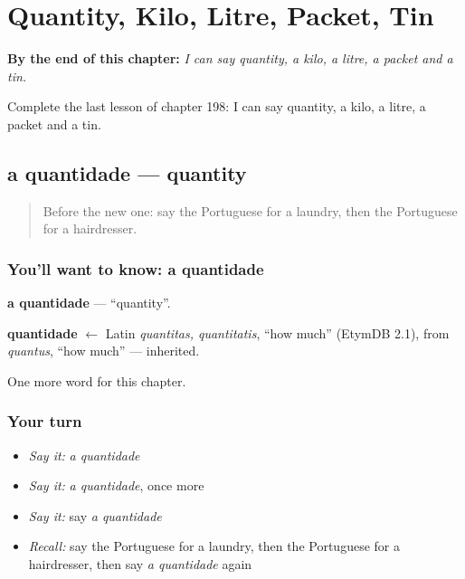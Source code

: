 
\chapter{Quantity, Kilo, Litre, Packet, Tin}
\label{ch:pt-quantity-kilo-litre-packet-tin}

\begin{chapteropening}
\textbf{By the end of this chapter:} \emph{I can say quantity, a kilo, a litre, a packet and a tin.}

Complete the last lesson of chapter 198: I can say quantity, a kilo, a litre, a packet and a tin.
\end{chapteropening}

\section[a quantidade]{a quantidade — quantity}

\label{lesson:PT-C198-quantidade}



\begin{quote}
Before the new one: say the Portuguese for a laundry, then the Portuguese for a hairdresser.
\end{quote}

\subsection*{You'll want to know: a quantidade}
\textbf{a quantidade} — \textquotedblleft{}quantity\textquotedblright{}.

\begin{cousinweb}
\textbf{quantidade} $\leftarrow$ Latin \emph{quantitas, quantitatis}, \textquotedblleft{}how much\textquotedblright{} (EtymDB 2.1), from \emph{quantus}, \textquotedblleft{}how much\textquotedblright{} — inherited.
\end{cousinweb}

\begin{grammarlens}[title={What you've built}]
One more word for this chapter.
\end{grammarlens}

\subsection*{Your turn}
\begin{itemize}
\raggedright
  \item \emph{Say it:} \emph{a quantidade}
  \item \emph{Say it:} \emph{a quantidade}, once more
  \item \emph{Say it:} say \emph{a quantidade}
  \item \emph{Recall:} say the Portuguese for a laundry, then the Portuguese for a hairdresser, then say \emph{a quantidade} again
\end{itemize}

